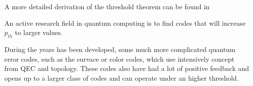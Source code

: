 A more detailed derivation of the threshold theorem can be found in \cite{DanielGottesman}













An active research field in quantum computing is to find codes that will increase $p_{th}$ to larger values.

During the years has been developed, some much more complicated quantum error codes, such as the survace or color codes, which use intensively concept from QEC and topology. These codes also have had a lot of positive feedback and opens up to a larger class of codes and can operate under an higher threshold.

